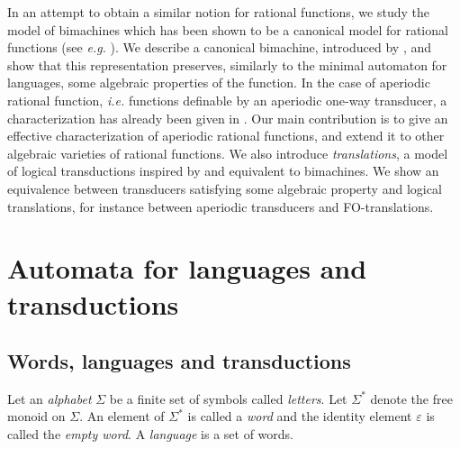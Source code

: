 \documentclass[12pt]{report}
\theoremstyle{definition}
\theoremstyle{remark}
\begin{document}
In an attempt to obtain a similar notion for rational functions, we study the model of bimachines \cite{schutzenberger61} which has been shown to be a canonical model for rational functions (see \emph{e.g.} \cite{berstelb79}).
We describe a canonical bimachine, introduced by \cite{reutenauers91}, and show that this representation preserves, similarly to the minimal automaton for languages, some algebraic properties of the function.
In the case of aperiodic rational function, \emph{i.e.} functions definable by an aperiodic one-way transducer, a characterization has already been given in \cite{reutenauers95}.
Our main contribution is to give an effective characterization of aperiodic rational functions, and extend it to other algebraic varieties of rational functions.
We also introduce \emph{translations}, a model of logical transductions inspired by and equivalent to bimachines.
We show an equivalence between transducers satisfying some algebraic property and logical translations, for instance between aperiodic transducers and FO-translations.


\tableofcontents



\chapter{Automata for languages and transductions}

\section{Words, languages and transductions}

Let an \emph{alphabet} $\Sigma$ be a finite set of symbols called \emph{letters}.
Let $\Sigma^\ast$ denote the free monoid on $\Sigma$.
An element of $\Sigma^\ast$ is called a \emph{word} and the identity element $\varepsilon$ is called the \emph{empty word}.
A \emph{language} is a set of words.
\end{document}
